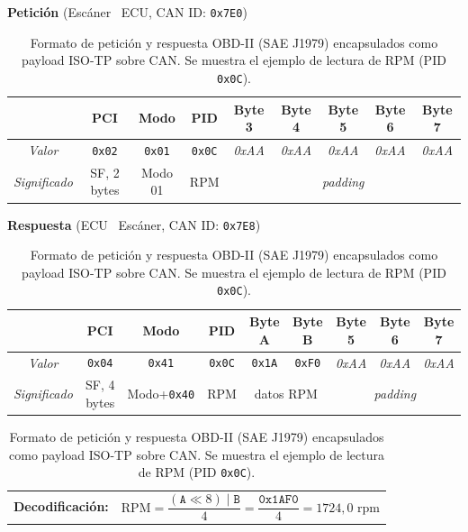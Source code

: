 
\begin{table}[!htbp]
\caption{Formato de petición y respuesta OBD-II (SAE J1979) encapsulados como payload ISO-TP sobre CAN. Se muestra el ejemplo de lectura de RPM (PID \texttt{0x0C}).}
\label{tab:obd2_format}
\centering
\renewcommand{\arraystretch}{1.4}

\textbf{Petición} (Escáner \textrightarrow\ ECU, CAN ID: \texttt{0x7E0})

\vspace{0.3em}
\begin{tabular}{|c|c|c|c|c|c|c|c|c|}
\hline
& \textbf{PCI} & \textbf{Modo} & \textbf{PID} &
\textbf{Byte 3} & \textbf{Byte 4} & \textbf{Byte 5} & \textbf{Byte 6} & \textbf{Byte 7} \\
\hline
\textit{Valor} &
\texttt{0x02} & \texttt{0x01} & \texttt{0x0C} &
\textit{0xAA} & \textit{0xAA} & \textit{0xAA} & \textit{0xAA} & \textit{0xAA} \\
\hline
\textit{Significado} &
SF, 2 bytes & Modo 01 & RPM &
\multicolumn{5}{c|}{\textit{padding}} \\
\hline
\end{tabular}

\vspace{1em}

\textbf{Respuesta} (ECU \textrightarrow\ Escáner, CAN ID: \texttt{0x7E8})

\vspace{0.3em}
\begin{tabular}{|c|c|c|c|c|c|c|c|c|}
\hline
& \textbf{PCI} & \textbf{Modo} & \textbf{PID} &
\textbf{Byte A} & \textbf{Byte B} & \textbf{Byte 5} & \textbf{Byte 6} & \textbf{Byte 7} \\
\hline
\textit{Valor} &
\texttt{0x04} & \texttt{0x41} & \texttt{0x0C} &
\texttt{0x1A} & \texttt{0xF0} &
\textit{0xAA} & \textit{0xAA} & \textit{0xAA} \\
\hline
\textit{Significado} &
SF, 4 bytes & Modo+\texttt{0x40} & RPM &
\multicolumn{2}{c|}{datos RPM} &
\multicolumn{3}{c|}{\textit{padding}} \\
\hline
\end{tabular}

\vspace{0.5em}
\begin{tabular}{ll}
\textbf{Decodificación:} & $\text{RPM} = \dfrac{(\texttt{A} \ll 8) \mid \texttt{B}}{4} = \dfrac{\texttt{0x1AF0}}{4} = 1724{,}0 \text{ rpm}$ \\
\end{tabular}
\end{table}
